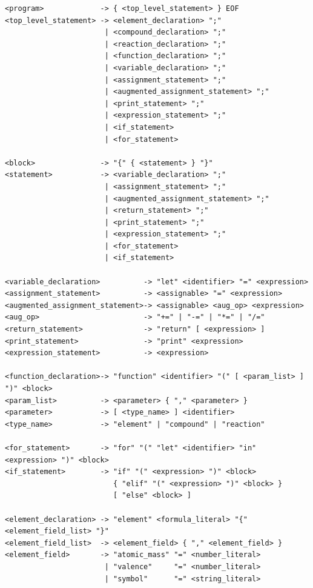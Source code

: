 \documentclass[11pt,a4paper]{article}
\begin{document}
\begin{lstlisting}[style=ebnf]
<program>             -> { <top_level_statement> } EOF
<top_level_statement> -> <element_declaration> ";"
                       | <compound_declaration> ";"
                       | <reaction_declaration> ";"
                       | <function_declaration> ";"
                       | <variable_declaration> ";"
                       | <assignment_statement> ";"
                       | <augmented_assignment_statement> ";"
                       | <print_statement> ";"
                       | <expression_statement> ";"
                       | <if_statement>
                       | <for_statement>

<block>               -> "{" { <statement> } "}"
<statement>           -> <variable_declaration> ";"
                       | <assignment_statement> ";"
                       | <augmented_assignment_statement> ";"
                       | <return_statement> ";"
                       | <print_statement> ";"
                       | <expression_statement> ";"
                       | <for_statement>
                       | <if_statement>

<variable_declaration>          -> "let" <identifier> "=" <expression>
<assignment_statement>          -> <assignable> "=" <expression>
<augmented_assignment_statement>-> <assignable> <aug_op> <expression>
<aug_op>                        -> "+=" | "-=" | "*=" | "/="
<return_statement>              -> "return" [ <expression> ]
<print_statement>               -> "print" <expression>
<expression_statement>          -> <expression>

<function_declaration>-> "function" <identifier> "(" [ <param_list> ] ")" <block>
<param_list>          -> <parameter> { "," <parameter> }
<parameter>           -> [ <type_name> ] <identifier>
<type_name>           -> "element" | "compound" | "reaction"

<for_statement>       -> "for" "(" "let" <identifier> "in" <expression> ")" <block>
<if_statement>        -> "if" "(" <expression> ")" <block>
                         { "elif" "(" <expression> ")" <block> }
                         [ "else" <block> ]

<element_declaration> -> "element" <formula_literal> "{" <element_field_list> "}"
<element_field_list>  -> <element_field> { "," <element_field> }
<element_field>       -> "atomic_mass" "=" <number_literal>
                       | "valence"     "=" <number_literal>
                       | "symbol"      "=" <string_literal>


\end{lstlisting}
\end{document}
